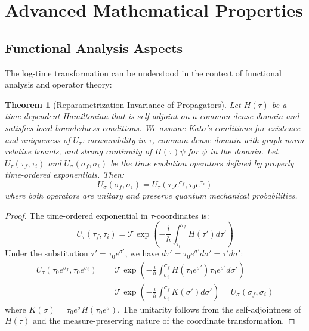 \documentclass[11pt,a4paper]{article}
\newtheorem{theorem}{Theorem}[section]
\begin{document}
\section{Advanced Mathematical Properties}

\subsection{Functional Analysis Aspects}

The log-time transformation can be understood in the context of functional analysis and operator theory:

\begin{theorem}[Reparametrization Invariance of Propagators]
Let $H(\tau)$ be a time-dependent Hamiltonian that is self-adjoint on a common dense domain and satisfies local boundedness conditions. We assume Kato's conditions for existence and uniqueness of $U_{\tau}$: measurability in $\tau$, common dense domain with graph-norm relative bounds, and strong continuity of $H(\tau)\psi$ for $\psi$ in the domain. Let $U_{\tau}(\tau_f, \tau_i)$ and $U_{\sigma}(\sigma_f, \sigma_i)$ be the time evolution operators defined by properly time-ordered exponentials. Then:
\begin{equation}
U_{\sigma}(\sigma_f, \sigma_i) = U_{\tau}(\tau_0 e^{\sigma_f}, \tau_0 e^{\sigma_i})
\end{equation}
where both operators are unitary and preserve quantum mechanical probabilities.
\end{theorem}

\begin{proof}
The time-ordered exponential in $\tau$-coordinates is:
\begin{equation}
U_{\tau}(\tau_f, \tau_i) = \mathcal{T}\exp\left(-\frac{i}{\hbar}\int_{\tau_i}^{\tau_f} H(\tau') d\tau'\right)
\end{equation}
Under the substitution $\tau' = \tau_0 e^{\sigma'}$, we have $d\tau' = \tau_0 e^{\sigma'} d\sigma' = \tau' d\sigma'$:
\begin{align}
U_{\tau}(\tau_0 e^{\sigma_f}, \tau_0 e^{\sigma_i}) &= \mathcal{T}\exp\left(-\frac{i}{\hbar}\int_{\sigma_i}^{\sigma_f} H(\tau_0 e^{\sigma'}) \tau_0 e^{\sigma'} d\sigma'\right) \\
&= \mathcal{T}\exp\left(-\frac{i}{\hbar}\int_{\sigma_i}^{\sigma_f} K(\sigma') d\sigma'\right) = U_{\sigma}(\sigma_f, \sigma_i)
\end{align}
where $K(\sigma) = \tau_0 e^{\sigma} H(\tau_0 e^{\sigma})$. The unitarity follows from the self-adjointness of $H(\tau)$ and the measure-preserving nature of the coordinate transformation.
\end{proof}
\end{document}
